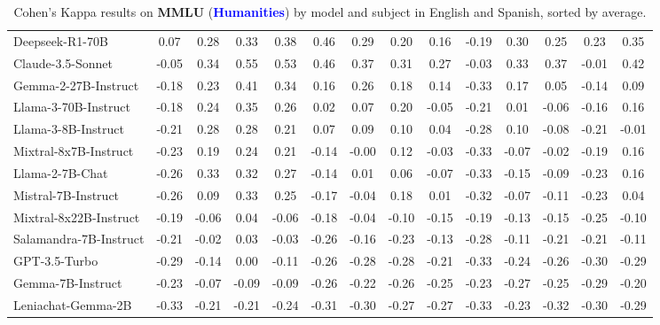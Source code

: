 \begin{table*}[ht]
{\begin{tabular}{lccccccccccccc}
Deepseek-R1-70B & 0.07 & 0.28 & 0.33 & 0.38 & 0.46 & 0.29 & 0.20 & 0.16 & -0.19 & 0.30 & 0.25 & 0.23 & 0.35 \\
Claude-3.5-Sonnet & -0.05 & 0.34 & 0.55 & 0.53 & 0.46 & 0.37 & 0.31 & 0.27 & -0.03 & 0.33 & 0.37 & -0.01 & 0.42 \\
Gemma-2-27B-Instruct & -0.18 & 0.23 & 0.41 & 0.34 & 0.16 & 0.26 & 0.18 & 0.14 & -0.33 & 0.17 & 0.05 & -0.14 & 0.09 \\
Llama-3-70B-Instruct & -0.18 & 0.24 & 0.35 & 0.26 & 0.02 & 0.07 & 0.20 & -0.05 & -0.21 & 0.01 & -0.06 & -0.16 & 0.16 \\
Llama-3-8B-Instruct & -0.21 & 0.28 & 0.28 & 0.21 & 0.07 & 0.09 & 0.10 & 0.04 & -0.28 & 0.10 & -0.08 & -0.21 & -0.01 \\
Mixtral-8x7B-Instruct & -0.23 & 0.19 & 0.24 & 0.21 & -0.14 & -0.00 & 0.12 & -0.03 & -0.33 & -0.07 & -0.02 & -0.19 & 0.16 \\
Llama-2-7B-Chat & -0.26 & 0.33 & 0.32 & 0.27 & -0.14 & 0.01 & 0.06 & -0.07 & -0.33 & -0.15 & -0.09 & -0.23 & 0.16 \\
Mistral-7B-Instruct & -0.26 & 0.09 & 0.33 & 0.25 & -0.17 & -0.04 & 0.18 & 0.01 & -0.32 & -0.07 & -0.11 & -0.23 & 0.04 \\
Mixtral-8x22B-Instruct & -0.19 & -0.06 & 0.04 & -0.06 & -0.18 & -0.04 & -0.10 & -0.15 & -0.19 & -0.13 & -0.15 & -0.25 & -0.10 \\
Salamandra-7B-Instruct & -0.21 & -0.02 & 0.03 & -0.03 & -0.26 & -0.16 & -0.23 & -0.13 & -0.28 & -0.11 & -0.21 & -0.21 & -0.11 \\
GPT-3.5-Turbo & -0.29 & -0.14 & 0.00 & -0.11 & -0.26 & -0.28 & -0.28 & -0.21 & -0.33 & -0.24 & -0.26 & -0.30 & -0.29 \\
Gemma-7B-Instruct & -0.23 & -0.07 & -0.09 & -0.09 & -0.26 & -0.22 & -0.26 & -0.25 & -0.23 & -0.27 & -0.25 & -0.29 & -0.20 \\
Leniachat-Gemma-2B & -0.33 & -0.21 & -0.21 & -0.24 & -0.31 & -0.30 & -0.27 & -0.27 & -0.33 & -0.23 & -0.32 & -0.30 & -0.29 \\
\bottomrule

\bottomrule
\end{tabular}
}

\caption{Cohen's Kappa results on \textbf{MMLU} (\textbf{\textcolor{blue}{Humanities}}) by model and subject in English and Spanish, sorted by average.}
\label{tablammlu3}
\end{table*}








